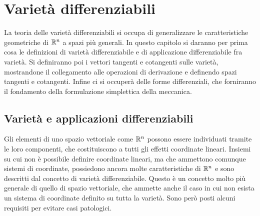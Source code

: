 \chapter{Varietà differenziabili}

La teoria delle varietà differenziabili si occupa di generalizzare le caratteristiche geometriche di $\mathbb{R}^n$ a spazi più generali. In questo capitolo si daranno per prima cosa le definizioni di varietà differenziabile e di applicazione differenziabile fra varietà. Si definiranno poi i vettori tangenti e cotangenti sulle varietà, mostrandone il collegamento alle operazioni di derivazione e definendo spazi tangenti e cotangenti. Infine ci si occuperà delle forme differenziali, che forniranno il fondamento della formulazione simplettica della meccanica.
\section{Varietà e applicazioni differenziabili} \label{sec:smoothMfd}
Gli elementi di uno spazio vettoriale come $\mathbb{R}^{n}$ possono essere individuati tramite le loro componenti, che costituiscono a tutti gli effetti coordinate lineari. Insiemi su cui non è possibile definire coordinate lineari, ma che ammettono comunque sistemi di coordinate, possiedono ancora molte caratteristiche di $\mathbb{R}^{n}$ e sono descritti dal concetto di varietà differenziabile. Questo è un concetto molto più generale di quello di spazio vettoriale, che ammette anche il caso in cui non esista un sistema di coordinate definito su tutta la varietà. Sono però posti alcuni requisiti per evitare casi patologici.

